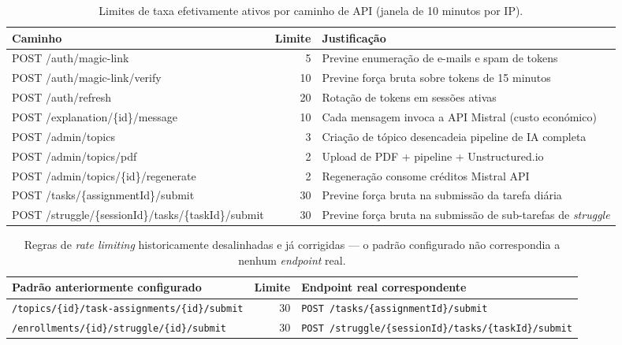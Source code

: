 \begin{table}[htb]
\centering
\caption{Limites de taxa efetivamente ativos por caminho de API (janela de 10 minutos por IP).}
\label{tab:rate-limits-full}
\begin{tabular}{@{}lrl@{}}
\toprule
\textbf{Caminho} & \textbf{Limite} & \textbf{Justificação} \\
\midrule
POST /auth/magic-link              & 5  & Previne enumeração de e-mails e spam de tokens \\
POST /auth/magic-link/verify       & 10 & Previne força bruta sobre tokens de 15 minutos \\
POST /auth/refresh                 & 20 & Rotação de tokens em sessões ativas \\
POST /explanation/\{id\}/message   & 10 & Cada mensagem invoca a API Mistral (custo económico) \\
POST /admin/topics                 & 3  & Criação de tópico desencadeia pipeline de IA completa \\
POST /admin/topics/pdf             & 2  & Upload de PDF + pipeline + Unstructured.io \\
POST /admin/topics/\{id\}/regenerate & 2 & Regeneração consome créditos Mistral API \\
POST /tasks/\{assignmentId\}/submit & 30 & Previne força bruta na submissão da tarefa diária \\
POST /struggle/\{sessionId\}/tasks/\{taskId\}/submit & 30 & Previne força bruta na submissão de sub-tarefas de \textit{struggle} \\
\bottomrule
\end{tabular}
\end{table}

\begin{table}[htb]
\centering
\caption{Regras de \textit{rate limiting} historicamente desalinhadas e já corrigidas --- o padrão configurado não correspondia a nenhum \textit{endpoint} real.}
\label{tab:rate-limits-broken}
\begin{tabular}{@{}lrl@{}}
\toprule
\textbf{Padrão anteriormente configurado} & \textbf{Limite} & \textbf{Endpoint real correspondente} \\
\midrule
\texttt{/topics/\{id\}/task-assignments/\{id\}/submit} & 30 & \texttt{POST /tasks/\{assignmentId\}/submit} \\
\texttt{/enrollments/\{id\}/struggle/\{id\}/submit}    & 30 & \texttt{POST /struggle/\{sessionId\}/tasks/\{taskId\}/submit} \\
\bottomrule
\end{tabular}
\end{table}

